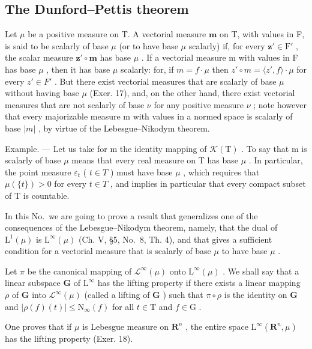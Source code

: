 \subsection{The Dunford--Pettis theorem}

Let \(\mu\) be a positive measure on T. A vectorial measure \(\mathbf{m}\) on T, with values in F, is said to be scalarly of base \(\mu\) (or to have base \(\mu\) scalarly) if, for every \(\mathbf{z}' \in \mathrm{F}'\) , the scalar measure \(\mathbf{z}' \circ \mathbf{m}\) has base \(\mu\) . If a vectorial measure m with values in F has base \(\mu\) , then it has base \(\mu\) scalarly: for, if \(m = f \cdot \mu\) then \(z' \circ m = \langle z', f \rangle \cdot \mu\) for every \(z' \in F'\) . But there exist vectorial measures that are scalarly of base \(\mu\) without having base \(\mu\) (Exer. 17), and, on the other hand, there exist vectorial measures that are not scalarly of base \(\nu\) for any positive measure \(\nu\) ; note however that every majorizable measure m with values in a normed space is scalarly of base \(|m|\) , by virtue of the Lebesgue--Nikodym theorem.

Example. --- Let us take for m the identity mapping of \(\mathcal{K}(\mathrm{T})\) . To say that m is scalarly of base \(\mu\) means that every real measure on T has base \(\mu\) . In particular, the point measure \(\varepsilon_{t}\) ( \(t \in T\) ) must have base \(\mu\) , which requires that \(\mu(\{t\}) > 0\) for every \(t \in T\) , and implies in particular that every compact subset of T is countable.

In this No.~we are going to prove a result that generalizes one of the consequences of the Lebesgue--Nikodym theorem, namely, that the dual of \(\mathrm{L}^{1}(\mu)\) is \(\mathrm{L}^{\infty}(\mu)\) (Ch. V, §5, No.~8, Th. 4), and that gives a sufficient condition for a vectorial measure that is scalarly of base \(\mu\) to have base \(\mu\) .

Let \(\pi\) be the canonical mapping of \(\mathcal{L}^{\infty}(\mu)\) onto \(\mathrm{L}^{\infty}(\mu)\) . We shall say that a linear subspace \(\mathbf{G}\) of \(\mathrm{L}^{\infty}\) has the lifting property if there exists a linear mapping \(\rho\) of \(\mathbf{G}\) into \(\mathcal{L}^{\infty}(\mu)\) (called a lifting of \(\mathbf{G}\) ) such that \(\pi \circ \rho\) is the identity on \(\mathbf{G}\) and \(|\rho(f)(t)| \leqslant \mathrm{N}_{\infty}(f)\) for all \(t \in \mathrm{T}\) and \(f \in \mathrm{G}\) .

One proves that if \(\mu\) is Lebesgue measure on \(\mathbf{R}^n\) , the entire space \(\mathrm{L}^{\infty}(\mathbf{R}^{n},\mu)\) has the lifting property (Exer. 18).

